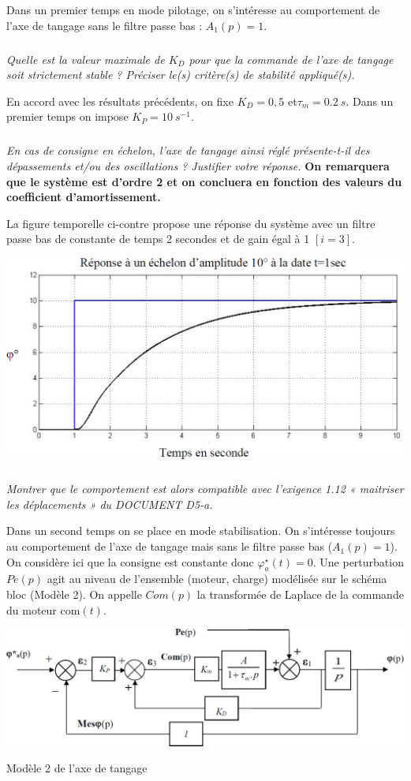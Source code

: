 \documentclass[10pt,fleqn]{article} %
\begin{document}
Dans un premier temps en mode pilotage, on s’intéresse au comportement de l’axe de tangage sans le filtre passe bas : $A_1(p)=1$. 

\subparagraph{\label{q24}}\textit{Quelle est la valeur maximale de $K_D$ pour que la commande de l’axe de tangage soit strictement stable ? Préciser le(s) critère(s) de stabilité appliqué(s).}

En accord avec les résultats précédents, on fixe $K_D = 0,5$ et$\tau_m=\SI{0,2}{s}$.
Dans un premier temps on impose  $K_P = \SI{10}{s^{-1}}$.

\subparagraph{\label{q25}}\textit{En cas de consigne en échelon, l’axe de tangage ainsi réglé présente-t-il des dépassements et/ou des oscillations ? Justifier votre réponse. } \textbf{On remarquera que le système est d'ordre 2 et on concluera en fonction des valeurs du coefficient d'amortissement.}


La figure temporelle ci-contre propose une réponse du système avec un filtre passe bas de constante de temps 2 secondes et de gain égal à 1 $[i=3]$.

\begin{center}
\includegraphics[width=.5\linewidth]{fig_d}

\end{center}




\subparagraph{\label{q26}}\textit{Montrer que le comportement est alors compatible avec l’exigence 1.12 « maitriser les déplacements » du DOCUMENT D5-a.}

Dans un second temps on se place en mode stabilisation. On s’intéresse toujours au comportement de l’axe de tangage mais sans le filtre passe bas ($A_1(p)=1$).
On considère ici que la consigne est constante donc $\varphi^{\star}_a(t)=0$. Une perturbation $Pe(p)$ agit au niveau de l’ensemble (moteur, charge) modélisée sur le schéma bloc (Modèle 2). On appelle $Com(p)$ la transformée de Laplace de la commande du moteur $\text{com}(t)$.

\begin{center}
\includegraphics[width=\linewidth]{fig_e}

Modèle 2 de l'axe de tangage
\end{center}
\end{document}

